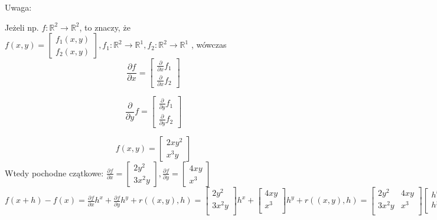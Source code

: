 \documentclass[../main.tex]{subfiles}
\begin{document}
\begin{large}
Uwaga:
\end{large}
Jeżeli np. $f: \mathbb{R}^{2} \to \mathbb{R}^{2}$, to znaczy, że\\
$f(x,y) =
\left [
\begin{matrix}
    f_1 (x,y)\\
    f_2 (x,y)
\end{matrix}
\right ], f_1 : \mathbb{R}^{2} \to \mathbb{R}^{1}, f_2 : \mathbb{R}^{2} \to \mathbb{R}^{1}$
, wówczas
$$\frac{\partial f}{\partial x} =
\left [
    \begin{matrix}
        \frac{\partial}{\partial x} f_1 \\
        \frac{\partial}{\partial x} f_2
    \end{matrix}
\right ]$$

$$\frac{\partial}{\partial y} f =
\left [
    \begin{matrix}
        \frac{\partial}{\partial y} f_1 \\
        \frac{\partial}{\partial y} f_2
    \end{matrix}
\right ]$$

\begin{przyklad}
\end{przyklad}
$$f(x,y) = \left [
\begin{matrix}
    2xy^2\\
    x^3 y
\end{matrix}\right ]$$
Wtedy pochodne czątkowe: $\frac{\partial f}{\partial x} = \left [ \begin{matrix} 2y^2\\
3x^2 y
    \end{matrix}\right ], \frac{\partial f}{\partial y} = \left [ \begin{matrix} 4xy\\
x^3
\end{matrix}\right ] $\\
$f(x+h)-f(x) = \frac{\partial f}{\partial x} h^x + \frac{\partial f}{\partial y} h^y + r((x,y),h) = \left [ \begin{matrix}
2y^2\\
3x^2 y\\
    \end{matrix}\right ] h^x + \left [ \begin{matrix}
4xy\\
x^3\\
\end{matrix}\right ] h^y + r((x,y),h)
= \left [ \begin{matrix}
2y^2    &4xy\\
3x^2 y  &x^3\\
\end{matrix}\right ]
\left [ \begin{matrix}
h^x\\
h^y\\
\end{matrix}\right ]
+ r((x,y),h)$
\end{document}
